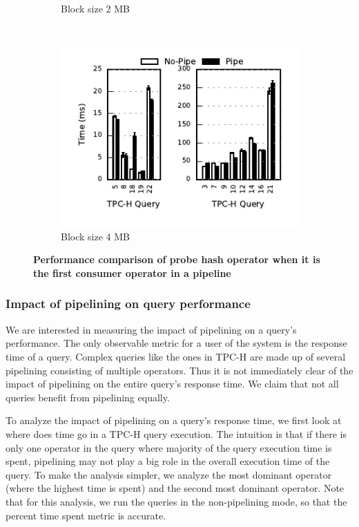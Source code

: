 \begin{figure}[t]
\begin{subfigure}[ht]{0.32\textwidth}
		\caption{Block size 2 MB}		
	\end{subfigure}
	~
	\begin{subfigure}[ht]{0.32\textwidth}
		\includegraphics[width=\textwidth]{pipeline/figures/first-consumer-comparison-4mb-withlip}	
		\caption{Block size 4 MB}
	\end{subfigure}
	\caption{\textbf{Performance comparison of probe hash operator when it is the first consumer operator in a pipeline}}
	\label{fig:first-consumer-comparison}
\end{figure}

\subsubsection{Impact of pipelining on query performance}
We are interested in measuring the impact of pipelining on a query's performance.
The only observable metric for a user of the system is the response time of a query.
Complex queries like the ones in TPC-H are made up of several pipelining consisting of multiple operators.
Thus it is not immediately clear of the impact of pipelining on the entire query's response time. 
%
We claim that not all queries benefit from pipelining equally.

To analyze the impact of pipelining on a query's response time, we first look at where does time go in a TPC-H query execution.
The intuition is that if there is only one operator in the query where majority of the query execution time is spent, pipelining may not play a big role in the overall execution time of the query.
To make the analysis simpler, we analyze the most dominant operator (where the highest time is spent) and the second most dominant operator. 
Note that for this analysis, we run the queries in the non-pipelining mode, so that the percent time spent metric is accurate.

